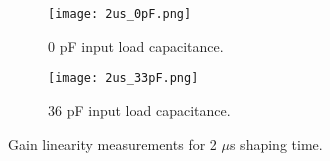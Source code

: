 \documentclass[../main/thesis.tex]{subfiles}
\begin{document}
\begin{figure} %
	\centering
	\begin{subfigure}{.5\textwidth}
		\centering
		\texttt{[image: 2us\_0pF.png]}
		\caption{0 pF input load capacitance.}
		\label{fig-gainlin-2-0}
	\end{subfigure}%
	\begin{subfigure}{.5\textwidth}
		\centering
		\texttt{[image: 2us\_33pF.png]}
		\caption{36 pF input load capacitance.}
		\label{fig-gainlin-2-33} 
	\end{subfigure}
	\caption{Gain linearity measurements for 2 $\mu$s shaping time.}
	\label{fig-gainlin-2}
\end{figure}
\end{document}
